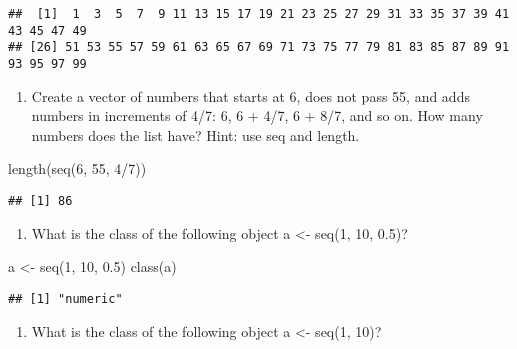 \documentclass[
]{article}
\newenvironment{Shaded}{\begin{snugshade}}{\end{snugshade}}
\newcommand{\DecValTok}[1]{\textcolor[rgb]{0.00,0.00,0.81}{#1}}
\newcommand{\FloatTok}[1]{\textcolor[rgb]{0.00,0.00,0.81}{#1}}
\newcommand{\FunctionTok}[1]{\textcolor[rgb]{0.00,0.00,0.00}{#1}}
\newcommand{\NormalTok}[1]{#1}
\newcommand{\OtherTok}[1]{\textcolor[rgb]{0.56,0.35,0.01}{#1}}
\newcommand{\SpecialCharTok}[1]{\textcolor[rgb]{0.00,0.00,0.00}{#1}}
\providecommand{\tightlist}{%
  \setlength{\itemsep}{0pt}\setlength{\parskip}{0pt}}
\begin{document}
\begin{verbatim}
##  [1]  1  3  5  7  9 11 13 15 17 19 21 23 25 27 29 31 33 35 37 39 41 43 45 47 49
## [26] 51 53 55 57 59 61 63 65 67 69 71 73 75 77 79 81 83 85 87 89 91 93 95 97 99
\end{verbatim}

\begin{enumerate}
\def\labelenumi{\arabic{enumi}.}
\setcounter{enumi}{7}
\tightlist
\item
  Create a vector of numbers that starts at 6, does not pass 55, and
  adds numbers in increments of 4/7: 6, 6 + 4/7, 6 + 8/7, and so on. How
  many numbers does the list have? Hint: use seq and length.
\end{enumerate}

\begin{Shaded}
\begin{Highlighting}[]
\FunctionTok{length}\NormalTok{(}\FunctionTok{seq}\NormalTok{(}\DecValTok{6}\NormalTok{, }\DecValTok{55}\NormalTok{, }\DecValTok{4}\SpecialCharTok{/}\DecValTok{7}\NormalTok{))}
\end{Highlighting}
\end{Shaded}

\begin{verbatim}
## [1] 86
\end{verbatim}

\begin{enumerate}
\def\labelenumi{\arabic{enumi}.}
\setcounter{enumi}{8}
\tightlist
\item
  What is the class of the following object a \textless- seq(1, 10,
  0.5)?
\end{enumerate}

\begin{Shaded}
\begin{Highlighting}[]
\NormalTok{a }\OtherTok{\textless{}{-}} \FunctionTok{seq}\NormalTok{(}\DecValTok{1}\NormalTok{, }\DecValTok{10}\NormalTok{, }\FloatTok{0.5}\NormalTok{)}
\FunctionTok{class}\NormalTok{(a)}
\end{Highlighting}
\end{Shaded}

\begin{verbatim}
## [1] "numeric"
\end{verbatim}

\begin{enumerate}
\def\labelenumi{\arabic{enumi}.}
\setcounter{enumi}{9}
\tightlist
\item
  What is the class of the following object a \textless- seq(1, 10)?
\end{enumerate}
\end{document}
